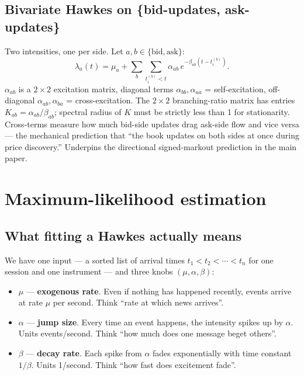 \subsection{Bivariate Hawkes on \{bid-updates, ask-updates\}}
\label{app:model-bivariate}

Two intensities, one per side. Let $a, b \in \{\text{bid}, \text{ask}\}$:
$$\lambda_a(t) = \mu_a + \sum_{b} \sum_{t_i^{(b)} < t} \alpha_{ab}\, e^{-\beta_{ab}(t - t_i^{(b)})}.$$
$\alpha_{ab}$ is a $2 \times 2$ excitation matrix, diagonal terms $\alpha_{bb}, \alpha_{aa}$ = self-excitation, off-diagonal $\alpha_{ab}, \alpha_{ba}$ = cross-excitation. The $2 \times 2$ branching-ratio matrix has entries $K_{ab} = \alpha_{ab}/\beta_{ab}$; spectral radius of $K$ must be strictly less than 1 for stationarity. Cross-terms measure how much bid-side updates drag ask-side flow and vice versa --- the mechanical prediction that ``the book updates on both sides at once during price discovery.'' Underpins the directional signed-markout prediction in the main paper.

\section{Maximum-likelihood estimation}
\label{app:mle}

\subsection{What fitting a Hawkes actually means}
\label{app:mle-plain}

We have one input --- a sorted list of arrival times $t_1 < t_2 < \cdots < t_n$ for one session and one instrument --- and three knobs $(\mu, \alpha, \beta)$:

\begin{itemize}
    \item $\mu$ --- \textbf{exogenous rate}. Even if nothing has happened recently, events arrive at rate $\mu$ per second. Think ``rate at which news arrives''.
    \item $\alpha$ --- \textbf{jump size}. Every time an event happens, the intensity spikes up by $\alpha$. Units events/second. Think ``how much does one message beget others''.
    \item $\beta$ --- \textbf{decay rate}. Each spike from $\alpha$ fades exponentially with time constant $1/\beta$. Units 1/second. Think ``how fast does excitement fade''.
\end{itemize}

